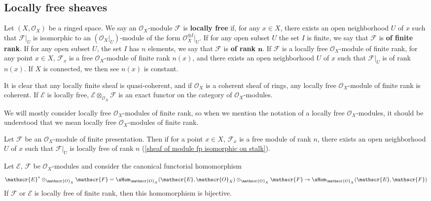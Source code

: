 \subsection{Locally free sheaves}
Let $(X,\mathscr{O}_X)$ be a ringed space. We say an $\mathscr{O}_X$-module $\mathscr{F}$ is \textbf{locally free} if, for any $x\in X$, there exists an open neighborhood $U$ of $x$ such that $\mathscr{F}|_U$ is isomorphic to an $(\mathscr{O}_X|_U)$-module of the form $\mathscr{O}_X^{\oplus I}|_U$. If for any open subset $U$ the set $I$ is finite, we say that $\mathscr{F}$ is \textbf{of finite rank}. If for any open subset $U$, the set $I$ has $n$ elements, we say that $\mathscr{F}$ is \textbf{of rank $\bm{n}$}. If $\mathscr{F}$ is a locally free $\mathscr{O}_X$-module of finite rank, for any point $x\in X$, $\mathscr{F}_x$ is a free $\mathscr{O}_X$-module of finite rank $n(x)$, and there exists an open neighborhood $U$ of $x$ such that $\mathscr{F}|_U$ is of rank $n(x)$. If $X$ is connected, we then see $n(x)$ is constant.\par
It is clear that any locally finite sheaf is quasi-coherent, and if $\mathscr{O}_X$ is a coherent sheaf of rings, any locally free $\mathscr{O}_X$-module of finite rank is coherent. If $\mathscr{E}$ is locally free, $\mathscr{E}\otimes_{\mathscr{O}_X}\mathscr{F}$ is an exact functor on the category of $\mathscr{O}_X$-modules.\par
We will mostly consider locally free $\mathscr{O}_X$-modules of finite rank, so when we mention the notation of a locally free $\mathscr{O}_X$-modules, it should be understood that we mean locally free $\mathscr{O}_X$-modules of finite rank.\par
\begin{example}
Let $\mathscr{F}$ be an $\mathscr{O}_X$-module of finite presentation. Then if for a point $x\in X$, $\mathscr{F}_x$ is a free module of rank $n$, there exists an open neighborhood $U$ of $x$ such that $\mathscr{F}|_U$ is locally free of rank $n$ (\cref{sheaf of module fp isomorphic on stalk}).
\end{example}
\begin{proposition}\label{sheaf of module local free tensor with dual iso}
Let $\mathscr{E}$, $\mathscr{F}$ be $\mathscr{O}_X$-modules and consider the canonical functorial homomorphism
\[\mathscr{E}^*\otimes_{\mathscr{O}_X}\mathscr{F}=\sHom_{\mathscr{O}_X}(\mathscr{E},\mathscr{O}_X)\otimes_{\mathscr{O}_X}\mathscr{F}\to\sHom_{\mathscr{O}_X}(\mathscr{E},\mathscr{F})\]
If $\mathscr{F}$ or $\mathscr{E}$ is locally free of finite rank, then this homomorphism is bijective.
\end{proposition}
